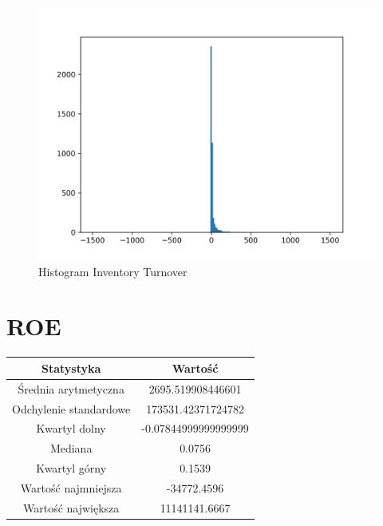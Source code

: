 \documentclass{article}
\begin{document}
\begin{figure}[h!]
    \includegraphics[width=\linewidth]{variables/Inventory Turnover.png}
    \caption{Histogram Inventory Turnover }
\end{figure}\section{ ROE }

\begin{center}
    \begin{tabular}{|c | c|} 
    \hline
    Statystyka & Wartość \\
    \hline\hline
    Średnia arytmetyczna & 2695.519908446601 \\ 
    \hline
    Odchylenie standardowe & 173531.42371724782 \\
    \hline
    Kwartyl dolny & -0.07844999999999999 \\
    \hline
    Mediana & 0.0756 \\
    \hline
    Kwartyl górny & 0.1539 \\
    \hline
    Wartość najmniejsza & -34772.4596 \\
    \hline
    Wartość największa & 11141141.6667 \\
    \hline
   \end{tabular}
\end{center}
\end{document}
